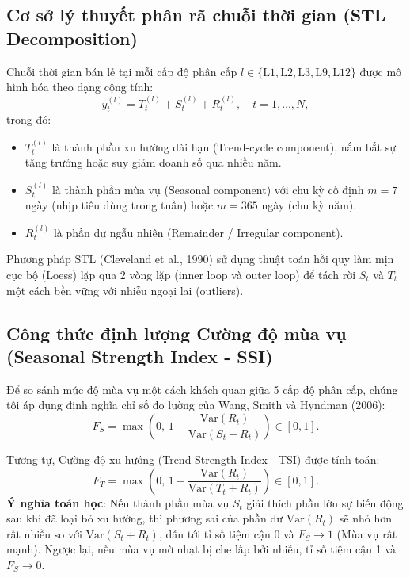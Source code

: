 \documentclass[12pt,a4paper,oneside]{article}
\begin{document}
\subsection{Cơ sở lý thuyết phân rã chuỗi thời gian (STL Decomposition)}

Chuỗi thời gian bán lẻ tại mỗi cấp độ phân cấp $l \in \{\text{L1}, \text{L2}, \text{L3}, \text{L9}, \text{L12}\}$ được mô hình hóa theo dạng cộng tính:
\begin{equation}
    y_t^{(l)} = T_t^{(l)} + S_t^{(l)} + R_t^{(l)}, \quad t = 1, \dots, N,
    \label{eq:stl_additive}
\end{equation}
trong đó:
\begin{itemize}
    \item $T_t^{(l)}$ là thành phần xu hướng dài hạn (Trend-cycle component), nắm bắt sự tăng trưởng hoặc suy giảm doanh số qua nhiều năm.
    \item $S_t^{(l)}$ là thành phần mùa vụ (Seasonal component) với chu kỳ cố định $m = 7$ ngày (nhịp tiêu dùng trong tuần) hoặc $m = 365$ ngày (chu kỳ năm).
    \item $R_t^{(l)}$ là phần dư ngẫu nhiên (Remainder / Irregular component).
\end{itemize}

Phương pháp STL (Cleveland et al., 1990) sử dụng thuật toán hồi quy làm mịn cục bộ (Loess) lặp qua 2 vòng lặp (inner loop và outer loop) để tách rời $S_t$ và $T_t$ một cách bền vững với nhiễu ngoại lai (outliers).

\subsection{Công thức định lượng Cường độ mùa vụ (Seasonal Strength Index - SSI)}

Để so sánh mức độ mùa vụ một cách khách quan giữa 5 cấp độ phân cấp, chúng tôi áp dụng định nghĩa chỉ số đo lường của Wang, Smith và Hyndman (2006):
\begin{equation}
    F_S = \max\!\left(0,\, 1 - \frac{\text{Var}(R_t)}{\text{Var}(S_t + R_t)}\right) \in [0, 1].
    \label{eq:ssi_formula}
\end{equation}

Tương tự, Cường độ xu hướng (Trend Strength Index - TSI) được tính toán:
\begin{equation}
    F_T = \max\!\left(0,\, 1 - \frac{\text{Var}(R_t)}{\text{Var}(T_t + R_t)}\right) \in [0, 1].
    \label{eq:tsi_formula}
\end{equation}
\textbf{Ý nghĩa toán học}: Nếu thành phần mùa vụ $S_t$ giải thích phần lớn sự biến động sau khi đã loại bỏ xu hướng, thì phương sai của phần dư $\text{Var}(R_t)$ sẽ nhỏ hơn rất nhiều so với $\text{Var}(S_t + R_t)$, dẫn tới tỉ số tiệm cận 0 và $F_S \rightarrow 1$ (Mùa vụ rất mạnh). Ngược lại, nếu mùa vụ mờ nhạt bị che lấp bởi nhiễu, tỉ số tiệm cận 1 và $F_S \rightarrow 0$.
\end{document}
